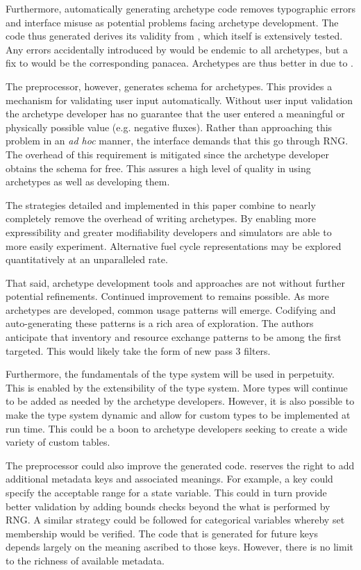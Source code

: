 Furthermore, automatically generating archetype code removes typographic errors and 
\cyclus interface misuse as potential problems facing archetype development. The 
code thus generated derives its validity from \cycpp, which itself is extensively 
tested. Any errors accidentally introduced by \cycpp would be endemic to all archetypes, 
but a fix to \cycpp would be the corresponding panacea. Archetypes are thus 
better in \cyclus due to \cycpp.

The preprocessor, however, generates schema for archetypes. This provides a mechanism 
for validating user input automatically.  Without user input validation the archetype 
developer has no guarantee that the user entered a meaningful or physically possible 
value (e.g. negative fluxes). Rather than approaching this problem in an \emph{ad hoc}
manner, the \cyclus interface demands that this go through \acrlong{RNG}.  The overhead 
of this requirement is mitigated since the archetype developer obtains the schema
for free. This assures a high level of quality in using archetypes as well as 
developing them.

The strategies detailed and implemented in this paper combine to nearly completely 
remove the overhead of writing archetypes. By enabling more expressibility and greater
modifiability developers and simulators are able to more easily experiment.  
Alternative fuel cycle representations may be explored quantitatively at an
unparalleled rate.

That said, archetype development tools and approaches are not without further 
potential refinements. Continued improvement to \cycpp remains possible. As more 
archetypes are developed, common usage patterns will emerge. Codifying and 
auto-generating these patterns is a rich area of exploration. The authors anticipate 
that inventory and resource exchange patterns to be among the first targeted.
This would likely take the form of new pass 3 filters.

Furthermore, the fundamentals of the \cyclus type system will be used in perpetuity.
This is enabled by the extensibility of the type system.  More types will continue to 
be added as needed by the archetype developers.  However, it is also possible to 
make the type system dynamic and allow for custom types to be implemented at run time.
This could be a boon to archetype developers seeking to create a wide variety of custom
tables.

The preprocessor could also improve the generated code. \Cyclus reserves the right
to add additional metadata keys and associated meanings.  For example, a 
key could specify the acceptable range for a state variable. This could in turn 
provide better validation by adding bounds checks beyond the what is performed
by \gls{RNG}. A similar strategy could be followed for categorical variables whereby
set membership would be verified. The code that is generated for future keys 
depends largely on the meaning ascribed to those keys. However, there is no limit 
to the richness of available metadata.


